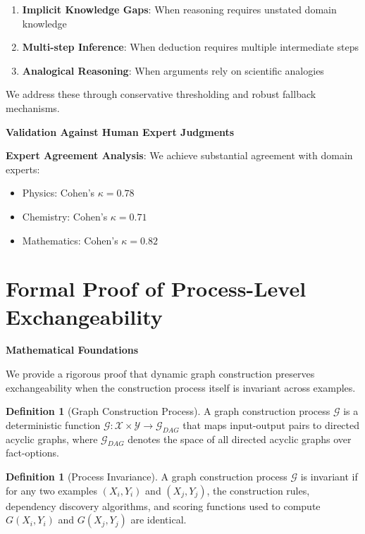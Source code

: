 \documentclass{uai2026} %
\theoremstyle{remark}
\theoremstyle{plain}
\theoremstyle{definition}
\newtheorem{definition}[theorem]{Definition}
\begin{document}
\begin{enumerate}
\item \textbf{Implicit Knowledge Gaps}: When reasoning requires unstated domain knowledge
\item \textbf{Multi-step Inference}: When deduction requires multiple intermediate steps
\item \textbf{Analogical Reasoning}: When arguments rely on scientific analogies
\end{enumerate}

We address these through conservative thresholding and robust fallback mechanisms.

\textbf{Validation Against Human Expert Judgments}

\textbf{Expert Agreement Analysis}: We achieve substantial agreement with domain experts:
\begin{itemize}
\item Physics: Cohen's $\kappa = 0.78$
\item Chemistry: Cohen's $\kappa = 0.71$ 
\item Mathematics: Cohen's $\kappa = 0.82$
\end{itemize}

\section{Formal Proof of Process-Level Exchangeability}
\label{app:exchangeability-proof}

\textbf{Mathematical Foundations}

We provide a rigorous proof that dynamic graph construction preserves exchangeability when the construction process itself is invariant across examples.

\begin{definition}[Graph Construction Process]
\label{def:graph-process}
A graph construction process $\mathcal{G}$ is a deterministic function $\mathcal{G}: \mathcal{X} \times \mathcal{Y} \rightarrow \mathcal{G}_{DAG}$ that maps input-output pairs to directed acyclic graphs, where $\mathcal{G}_{DAG}$ denotes the space of all directed acyclic graphs over fact-options.
\end{definition}

\begin{definition}[Process Invariance]
\label{def:process-invariance}
A graph construction process $\mathcal{G}$ is invariant if for any two examples $(X_i,Y_i)$ and $(X_j,Y_j)$, the construction rules, dependency discovery algorithms, and scoring functions used to compute $G(X_i,Y_i)$ and $G(X_j,Y_j)$ are identical.
\end{definition}
\end{document}
